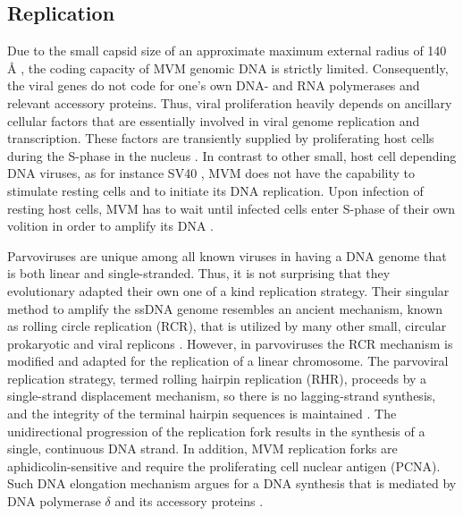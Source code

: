 
\subsection{Replication}
\label{Replication}
Due to the small capsid size of an approximate maximum external radius of 140 \r{A} \cite{pmid15299974}, the coding capacity of MVM genomic DNA is strictly limited. Consequently, the viral genes do not code for one's own DNA- and RNA polymerases and relevant accessory proteins. Thus, viral proliferation heavily depends on ancillary cellular factors that are essentially involved in viral genome replication and transcription. These factors are transiently supplied by proliferating host cells during the S-phase in the nucleus \cite{pmid16789120, pmid6602221, pmid3005655, pmid3296697, pmid9418888, pmid4673484, S-phase}. In contrast to other small, host cell depending DNA viruses, as for instance SV40 \cite{pmid4291013, pmid16578647}, MVM does not have the capability to stimulate resting cells and to initiate its DNA replication. Upon infection of resting host cells, MVM has to wait until infected cells enter S-phase of their own volition in order to amplify its DNA \cite{pmid4673484, pmid3346950, pmid10792046}.

Parvoviruses are unique among all known viruses in having a DNA genome that is both linear and single-stranded. Thus, it is not surprising that they evolutionary adapted their own one of a kind replication strategy. Their singular method to amplify the ssDNA genome resembles an ancient mechanism, known as rolling circle replication (RCR), that is utilized by many other small, circular prokaryotic and viral replicons \cite{pmid1630899, pmid8374079, pmid8824773, pmid9092519, pmid9010307}. However, in parvoviruses the RCR mechanism is modified and adapted for the replication of a linear chromosome. The parvoviral replication strategy, termed rolling hairpin replication (RHR), proceeds by a single-strand displacement mechanism, so there is no lagging-strand synthesis, and the integrity of the terminal hairpin sequences is maintained \cite{pmid967244}. The unidirectional progression of the replication fork results in the synthesis of a single, continuous DNA strand. In addition, MVM replication forks are aphidicolin-sensitive and require the proliferating cell nuclear antigen (PCNA). Such DNA elongation mechanism argues for a DNA synthesis that is mediated by DNA polymerase $\delta$ and its accessory proteins \cite{pmid10792046, pmid12050365}. 


